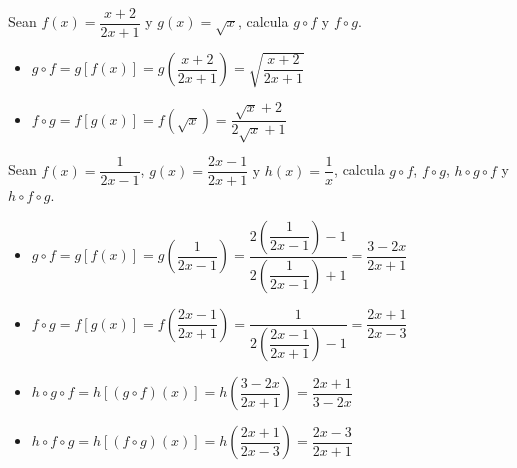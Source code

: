 \vspace{1cm}


\begin{ex}
	Sean $f(x)=\dfrac{x+2}{2x+1}$ y $g(x)=\sqrt{x}$, calcula $g \circ f$ y $f \circ g$.
	\begin{sol}
		\begin{itemize}
			\item $g \circ f = g[f(x)] = g(\dfrac{x+2}{2x+1}) = \sqrt{\dfrac{x+2}{2x+1}}$
			\item $f \circ g = f[g(x)] = f(\sqrt{x}) =\dfrac{\sqrt{x}+2}{2\sqrt{x}+1}$
		\end{itemize}
	\end{sol}
\end{ex}

\vspace{1cm}

\begin{ex}
	Sean $f(x)=\dfrac{1}{2x-1}$, $g(x)=\dfrac{2x-1}{2x+1} \text{ y } h(x)=\dfrac{1}{x}$, calcula $g \circ f$, $f \circ g$, $h \circ g \circ f$ y $h \circ f \circ g$.
	\begin{sol}
		\begin{itemize}
			\item $g \circ f = g[f(x)] = g(\dfrac{1}{2x-1}) = \dfrac{2(\dfrac{1}{2x-1})-1}{2(\dfrac{1}{2x-1})+1} = \dfrac{3-2x}{2x+1}$
			\item $f \circ g = f[g(x)] = f(\dfrac{2x-1}{2x+1}) =\dfrac{1}{2(\dfrac{2x-1}{2x+1})-1} = \dfrac{2x+1}{2x-3}$
			\item $h \circ g \circ f= h[(g \circ f)(x)] = h(\dfrac{3-2x}{2x+1}) = \dfrac{2x+1}{3-2x}$
			\item $h \circ f \circ g= h[(f \circ g)(x)] = h(\dfrac{2x+1}{2x-3}) = \dfrac{2x-3}{2x+1}$
		\end{itemize}
	\end{sol}
\end{ex}


